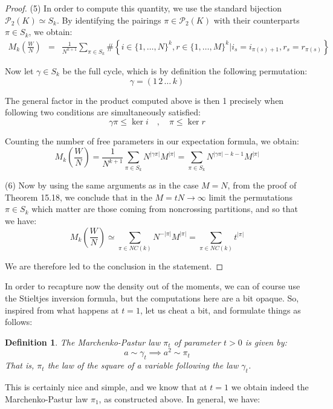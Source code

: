 \documentclass[12pt]{amsbook}
\newtheorem{definition}[theorem]{Definition}
\begin{document}
\begin{proof}
(5) In order to compute this quantity, we use the standard bijection $\mathcal P_2(K)\simeq S_k$. By identifying the pairings $\pi\in\mathcal P_2(K)$ with their counterparts $\pi\in S_k$, we obtain:
\begin{eqnarray*}
M_k\left(\frac{W}{N}\right)
&=&\frac{1}{N^{k+1}}\sum_{\pi\in S_k}\#\left\{i\in\{1,\ldots,N\}^k,r\in\{1,\ldots,M\}^k\Big|i_s=i_{\pi(s)+1},r_s=r_{\pi(s)}\right\}
\end{eqnarray*}

Now let $\gamma\in S_k$ be the full cycle, which is by definition the following permutation:
$$\gamma=(1 \, 2 \, \ldots \, k)$$

The general factor in the product computed above is then 1 precisely when following two conditions are simultaneously satisfied:
$$\gamma\pi\leq\ker i\quad,\quad 
\pi\leq\ker r$$

Counting the number of free parameters in our expectation formula, we obtain:
$$M_k\left(\frac{W}{N}\right)
=\frac{1}{N^{k+1}}\sum_{\pi\in S_k}N^{|\gamma\pi|}M^{|\pi|}
=\sum_{\pi\in S_k}N^{|\gamma\pi|-k-1}M^{|\pi|}$$

(6) Now by using the same arguments as in the case $M=N$, from the proof of Theorem 15.18, we conclude that in the $M=tN\to\infty$ limit the permutations $\pi\in S_k$ which matter are those coming from noncrossing partitions, and so that we have:
$$M_k\left(\frac{W}{N}\right)
\simeq\sum_{\pi\in NC(k)}N^{-|\pi|}M^{|\pi|}
=\sum_{\pi\in NC(k)}t^{|\pi|}$$

We are therefore led to the conclusion in the statement.
\end{proof}

In order to recapture now the density out of the moments, we can of course use the Stieltjes inversion formula, but the computations here are a bit opaque. So, inspired from what happens at $t=1$, let us cheat a bit, and formulate things as follows:


\begin{definition}
The Marchenko-Pastur law $\pi_t$ of parameter $t>0$ is given by:
$$a\sim\gamma_t\implies a^2\sim\pi_t$$
That is, $\pi_t$ the law of the square of a variable following the law $\gamma_t$.
\end{definition}

This is certainly nice and simple, and we know that at $t=1$ we obtain indeed the Marchenko-Pastur law $\pi_1$, as constructed above. In general, we have:
\end{document}
